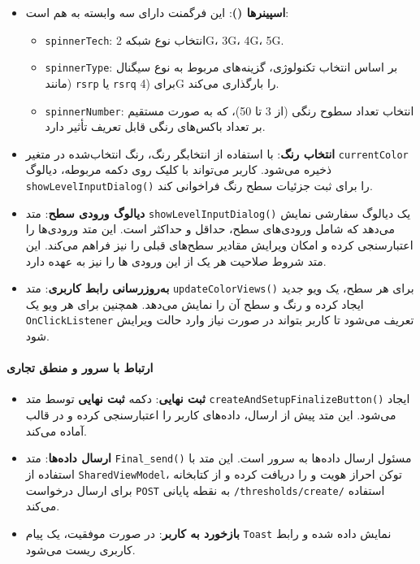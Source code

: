 \documentclass{report}
\begin{document}
\begin{itemize}
	\item \textbf{اسپینرها ()}: این فرگمنت دارای سه  وابسته به هم است:
	\begin{itemize}
		\item \texttt{spinnerTech}: انتخاب نوع شبکه 2G، 3G، 4G، 5G.
		\item \texttt{spinnerType}: بر اساس انتخاب تکنولوژی، گزینه‌های مربوط به نوع سیگنال (مانند \texttt{rsrp} یا \texttt{rsrq} برای (4G را بارگذاری می‌کند.
		\item \texttt{spinnerNumber}: انتخاب تعداد سطوح رنگی (از 3 تا 50)، که به صورت مستقیم بر تعداد باکس‌های رنگی قابل تعریف تأثیر دارد.
	\end{itemize}
	
	\item \textbf{انتخاب رنگ}: با استفاده از انتخابگر رنگ، رنگ انتخاب‌شده در متغیر \texttt{currentColor} ذخیره می‌شود. 
	کاربر می‌تواند با کلیک روی دکمه مربوطه، دیالوگ \texttt{showLevelInputDialog()} را برای ثبت جزئیات سطح رنگ فراخوانی کند.
	
	\item \textbf{دیالوگ ورودی سطح}: متد \texttt{showLevelInputDialog()} یک دیالوگ سفارشی نمایش می‌دهد که شامل ورودی‌های سطح، حداقل و حداکثر است. 
	این متد ورودی‌ها را اعتبارسنجی کرده و امکان ویرایش مقادیر سطح‌های قبلی را نیز فراهم می‌کند. این متد شروط صلاحیت هر یک از این ورودی ها را نیز به عهده دارد.
	
	\item \textbf{به‌روزرسانی رابط کاربری}: متد \texttt{updateColorViews()} برای هر سطح، یک ویو جدید ایجاد کرده و رنگ و سطح آن را نمایش می‌دهد. 
	همچنین برای هر ویو یک \texttt{OnClickListener} تعریف می‌شود تا کاربر بتواند در صورت نیاز وارد حالت ویرایش شود.
\end{itemize}

\paragraph{ارتباط با سرور و منطق تجاری}

\begin{itemize}
	\item \textbf{ثبت نهایی}: دکمه \textbf{ثبت نهایی} توسط متد \texttt{createAndSetupFinalizeButton()} ایجاد می‌شود. 
	این متد پیش از ارسال، داده‌های کاربر را اعتبارسنجی کرده و در قالب  آماده می‌کند.
	
	\item \textbf{ارسال داده‌ها}: متد \texttt{Final\_send()} مسئول ارسال داده‌ها به سرور است. 
	این متد با استفاده از \texttt{SharedViewModel}، توکن احراز هویت و  را دریافت کرده و از کتابخانه  برای ارسال درخواست \texttt{POST} به نقطه پایانی \texttt{/thresholds/create/} استفاده می‌کند. 
	
	\item \textbf{بازخورد به کاربر}: در صورت موفقیت، یک پیام \texttt{Toast} نمایش داده شده و رابط کاربری ریست می‌شود.
\end{itemize}
\end{document}
